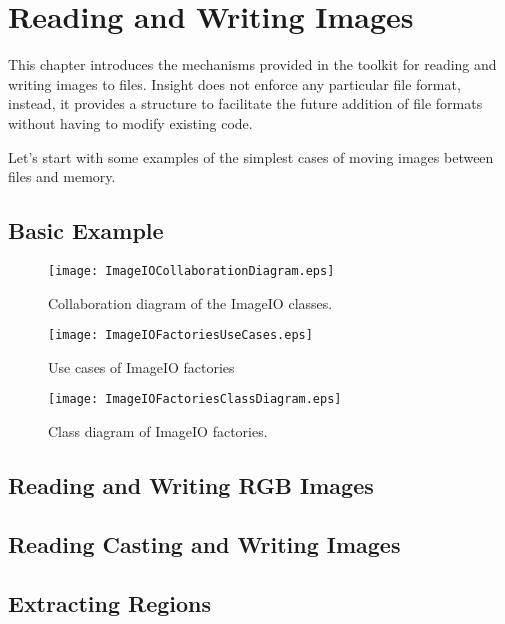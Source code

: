 

\chapter{Reading and Writing Images}
\label{sec:IO}

This chapter introduces the mechanisms provided in the toolkit for reading and
writing images to files. Insight does not enforce any particular file format,
instead, it provides a structure to facilitate the future addition of file
formats without having to modify existing code. 

Let's start with some examples of the simplest cases of moving images between files
and memory.

\section{Basic Example}
\label{sec:ImagReadWrite}



\begin{figure}
\center
\texttt{[image: ImageIOCollaborationDiagram.eps]}
\caption{Collaboration diagram of the ImageIO classes.}
\label{fig:ImageIOCollaborationDiagram}
\end{figure}

\begin{figure}
\center
\texttt{[image: ImageIOFactoriesUseCases.eps]}
\caption{Use cases of ImageIO factories}
\label{fig:ImageIOFactoriesUseCases}
\end{figure}

\begin{figure}
\center
\texttt{[image: ImageIOFactoriesClassDiagram.eps]}
\caption{Class diagram of ImageIO factories.}
\label{fig:ImageIOFactoriesClassDiagram}
\end{figure}

\section{Reading and Writing RGB Images}
\label{sec:RGBImagReadWrite}


\section{Reading Casting and Writing Images}
\label{sec:ImagReadCastWrite}


\section{Extracting Regions}
\label{sec:ImagReadExtractWrite}






